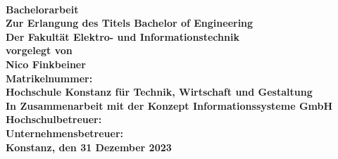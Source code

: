 \begin{titlepage}
\vspace*{-3cm}
    \begin{figure}[ht]
        \qquad\hfill
        \hspace{3cm}
    \end{figure}
        
	\begin{center}
		\vspace*{1cm}
		\LARGE\bf\myTopic\\
		\vspace*{1cm}
		\normalsize\rm
		\vspace*{1cm}
		\textbf{Bachelorarbeit}\\
		\vspace*{0.5cm}
		Zur Erlangung des Titels Bachelor of Engineering \\
		Der Fakultät Elektro- und Informationstechnik \\
		\vspace*{0.5cm}
		vorgelegt von  \\
	    \vspace*{0.25cm}
		\textbf{Nico Finkbeiner}  \\
		\vspace*{0.25cm}
		Matrikelnummer: \myMatrikelnummer \\
		\vspace*{1cm}
		Hochschule Konstanz für Technik, Wirtschaft und Gestaltung \\
		In Zusammenarbeit mit der Konzept Informationssysteme GmbH \\
		\vspace*{1cm}
		Hochschulbetreuer: \textbf{\mySupervisorTwo}\\
		Unternehmensbetreuer: \textbf{\mySupervisor}\\
		\vspace*{1cm}
		\textbf{Konstanz, den 31 Dezember 2023}
	\end{center}
\end{titlepage}
\newpage
\setcounter{page}{2}

